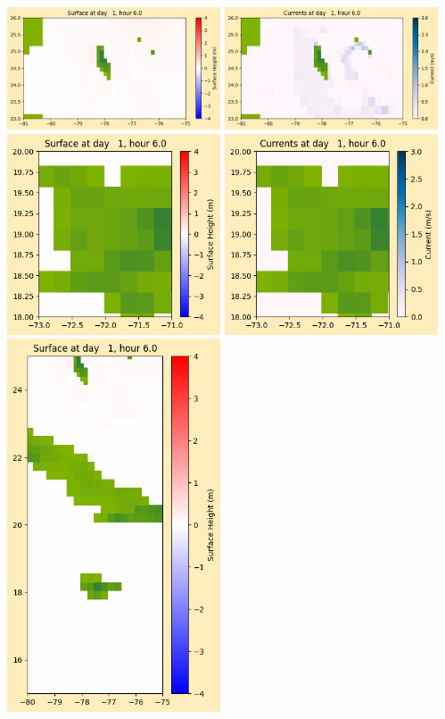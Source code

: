 \documentclass[11pt]{article}
\begin{document}
\vskip 10pt 
\includegraphics[width=0.475\textwidth]{frame0017fig1003.png}
\includegraphics[width=0.475\textwidth]{frame0017fig1004.png}
\vskip 10pt 
\includegraphics[width=0.475\textwidth]{frame0017fig1005.png}
\includegraphics[width=0.475\textwidth]{frame0017fig1006.png}
\vskip 10pt 
\includegraphics[width=0.475\textwidth]{frame0017fig1007.png}
\end{document}
